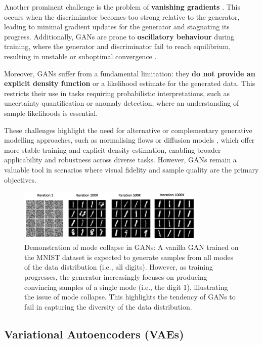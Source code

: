 Another prominent challenge is the problem of \textbf{vanishing gradients} \citep{arjovsky2017wasserstein}. This occurs when the discriminator becomes too strong relative to the generator, leading to minimal gradient updates for the generator and stagnating its progress. Additionally, GANs are prone to \textbf{oscillatory behaviour} during training, where the generator and discriminator fail to reach equilibrium, resulting in unstable or suboptimal convergence \citep{mescheder2018which}.

Moreover, GANs suffer from a fundamental limitation: they \textbf{do not provide an explicit density function} or a likelihood estimate for the generated data. This restricts their use in tasks requiring probabilistic interpretations, such as uncertainty quantification or anomaly detection, where an understanding of sample likelihoods is essential.

These challenges highlight the need for alternative or complementary generative modelling approaches, such as normalising flows \citep{papamakarios2019normalizing} or diffusion models \citep{ho2020denoising}, which offer more stable training and explicit density estimation, enabling broader applicability and robustness across diverse tasks. However, GANs remain a valuable tool in scenarios where visual fidelity and sample quality are the primary objectives.

\begin{figure}[h!]
    \centering
    \includegraphics[width=0.8\textwidth]{introduction/figures/mode_collapse.png}
    \caption{Demonstration of mode collapse in GANs: A vanilla GAN trained on the MNIST dataset is expected to generate samples from all modes of the data distribution (i.e., all digits). However, as training progresses, the generator increasingly focuses on producing convincing samples of a single mode (i.e., the digit 1), illustrating the issue of mode collapse. This highlights the tendency of GANs to fail in capturing the diversity of the data distribution.}
    \label{fig:mode_collapse}
\end{figure}



\subsection{Variational Autoencoders (VAEs)}\label{sec:vae}

